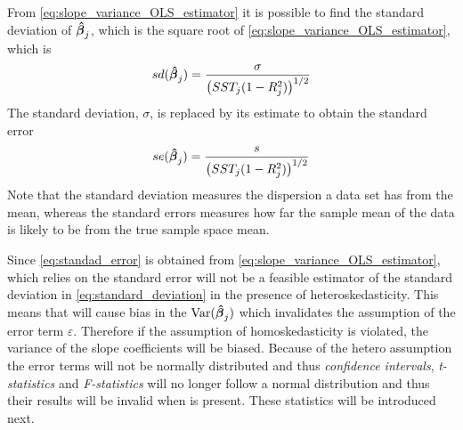 From \eqref{eq:slope_variance_OLS_estimator} it is possible to find the standard deviation of $\operatorname{\boldsymbol{\hat{\beta}}}_j$, which is the square root of \ref{eq:slope_variance_OLS_estimator}, which is
\begin{align}\label{eq:standard_deviation}
    sd(\operatorname{\boldsymbol{\hat{\beta}}}_j) = \dfrac{\sigma}{\left(SST_j(1- R_j^2)\right)^{1/2}}
\end{align}
The standard deviation, $\sigma$, is replaced by its estimate to obtain the standard error
\begin{align}\label{eq:standad_error}
    se(\operatorname{\boldsymbol{\hat{\beta}}}_j) = \dfrac{s}{\big(SST_j(1- R_j^2)\big)^{1/2}}
\end{align}
Note that the standard deviation measures the dispersion a data set has from the mean, whereas the standard errors measures how far the sample mean of the data is likely to be from the true sample space mean. 

Since \eqref{eq:standad_error} is obtained from \eqref{eq:slope_variance_OLS_estimator}, which relies on \homo the standard error will not be a feasible estimator of the standard deviation in \eqref{eq:standard_deviation} in the presence of heteroskedasticity. This means that \hetero will cause bias in the $\operatorname{\text{Var}}(\operatorname{\boldsymbol{\hat{\beta}}}_j)$ which invalidates the assumption of the error term $\varepsilon$.
Therefore if the assumption of homoskedasticity is violated, the variance of the slope coefficients will be biased. Because of the hetero assumption the error terms will not be normally distributed and thus \textit{confidence intervals}, \textit{t-statistics} and \textit{F-statistics} will no longer follow a normal distribution and thus their results will be invalid when \hetero is present. These statistics will be introduced next.










